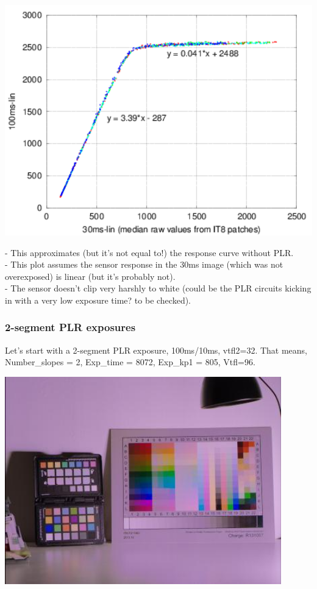 \begin{center}
\includegraphics[height=10cm]{images/100ms-vs-30ms-lin}
\end{center}

- This approximates (but it's not equal to!) the response curve without PLR.\\
- This plot assumes the sensor response in the 30ms image (which was not overexposed) is linear (but it's probably not).\\
- The sensor doesn't clip very harshly to white (could be the PLR circuits kicking in with a very low exposure time? to be checked).\\

\subsubsection{2-segment PLR exposures}

Let's start with a 2-segment PLR exposure, 100ms/10ms, vtfl2=32. That means, Number\_slopes = 2, Exp\_time = 8072, Exp\_kp1 = 805, Vtfl=96. 

\begin{center}
\includegraphics[height=9cm]{images/100ms-10ms-32}
\end{center}

